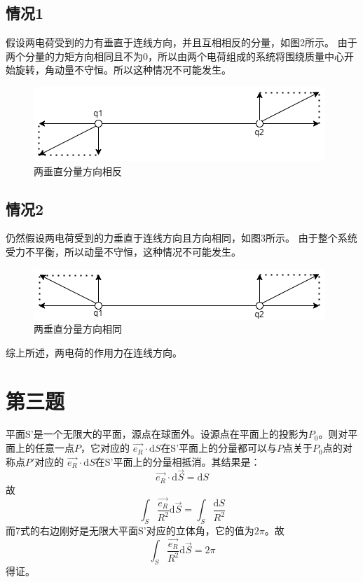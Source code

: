 \documentclass[a4paper]{article}
\begin{document}
		\subsection{情况1}
			假设两电荷受到的力有垂直于连线方向，并且互相相反的分量，如图2所示。
			由于两个分量的力矩方向相同且不为0，所以由两个电荷组成的系统将围绕质量中心开始旋转，角动量不守恒。所以这种情况不可能发生。
			\begin{figure}[htbp]
				\centering
				\includegraphics[scale=0.7]{2.1.png}
				\caption{两垂直分量方向相反}
			\end{figure}

		\subsection{情况2}
			仍然假设两电荷受到的力垂直于连线方向且方向相同，如图3所示。
			由于整个系统受力不平衡，所以动量不守恒，这种情况不可能发生。
			\begin{figure}[htbp]
				\centering
				\includegraphics[scale=0.7]{2.2.png}
				\caption{两垂直分量方向相同}
			\end{figure}

		综上所述，两电荷的作用力在连线方向。

	\section{第三题}
		平面S'是一个无限大的平面，源点在球面外。设源点在平面上的投影为$P_0$。则对平面上的任意一点$P$，它对应的
		$\vec{e_R}\cdot\mathrm{d}S$在S'平面上的分量都可以与$P$点关于$P_0$点的对称点$P'$对应的
		$\vec{e_R}\cdot\mathrm{d}S$在S'平面上的分量相抵消。其结果是：
		\begin{equation}
			\vec{e_R}\cdot\mathrm{d}\vec{S} = \mathrm{d}S
		\end{equation}
		故
		\begin{equation}
			\int_S \frac{\vec{e_R}}{R^2} \mathrm{d}\vec{S} = \int_S \frac{\mathrm{d}S}{R^2}
		\end{equation}
		而7式的右边刚好是无限大平面S'对应的立体角，它的值为$2\pi$。故
		\begin{equation}
			\int_S \frac{\vec{e_R}}{R^2} \mathrm{d}\vec{S} = 2\pi
		\end{equation}
		得证。
\end{document}
